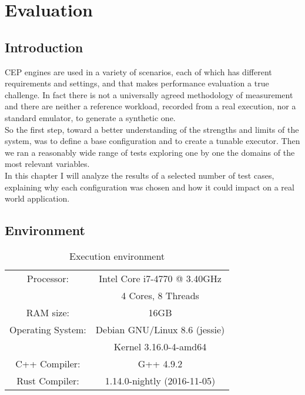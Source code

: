\chapter{Evaluation}

\section{Introduction}
CEP engines are used in a variety of scenarios, each of which has different requirements and settings, and that makes performance evaluation a true challenge. In fact there is not a universally agreed methodology of measurement and there are neither a reference workload, recorded from a real execution, nor a standard emulator, to generate a synthetic one.\\
So the first step, toward a better understanding of the strengths and limits of the system, was to define a base configuration and to create a tunable executor. Then we ran a reasonably wide range of tests exploring one by one the domains of the most relevant variables.\\
In this chapter I will analyze the results of a selected number of test cases, explaining why each configuration was chosen and how it could impact on a real world application.

\section{Environment}
\begin{table}[h]
  \begin{center}
    \begin{tabular}{|c|c|}
      \hline
      Processor: 		& Intel Core i7-4770 @ 3.40GHz\\
                        & 4 Cores, 8 Threads\\ 
      \hline
      RAM size: 		& 16GB\\
      \hline
      Operating System: & Debian GNU/Linux 8.6 (jessie)\\
                        & Kernel 3.16.0-4-amd64\\
      \hline
      C++ Compiler:     & G++ 4.9.2\\
      \hline
      Rust Compiler:    & 1.14.0-nightly (2016-11-05)\\
      \hline
    \end{tabular}
    \caption{Execution environment}
  \end{center}
\end{table}

